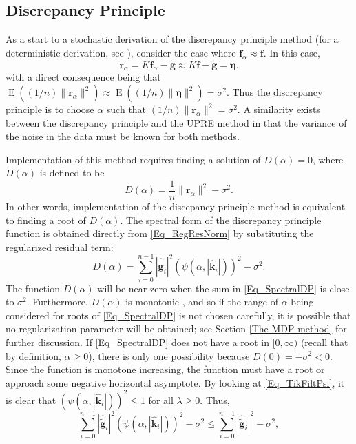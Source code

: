 \documentclass[12pt]{article}
\newcommand{\gnoise}{\widetilde{\mathbf{g}}}
\newcommand{\kdis}{\mathbf{k}}
\newcommand{\kmat}{K}	%
\newcommand{\fdis}{\mathbf{f}}
\newcommand{\regparam}{\alpha}
\newcommand{\freg}{\fdis_{\regparam}}	%
\newcommand{\mfilt}{\psi}
\newcommand{\noiseSD}{\sigma}	%
\newcommand{\noise}{\bm{\eta}}	%
\newcommand{\E}{\operatorname{E}}	%
\newcommand{\regres}{\mathbf{r}_{\regparam}}	%
\newcommand{\D}{D}	%
\begin{document}
\subsection{Discrepancy Principle} \label{Discrepancy Principle}
As a start to a stochastic derivation of the discrepancy principle method (for a deterministic derivation, see \cite{Vogel:2002}), consider the case where $\freg \approx \fdis$. In this case,
\[\regres = \kmat\freg - \gnoise \approx \kmat\fdis - \gnoise = \noise.\]
with a direct consequence being that $\E((1/n)\|\regres\|^2) \approx \E((1/n)\|\noise\|^2) =\noiseSD^2$. Thus the discrepancy principle is to choose $\regparam$ such that $(1/n)\|\regres\|^2 = \noiseSD^2$. A similarity exists between the discrepancy principle and the UPRE method in that the variance of the noise in the data must be known for both methods. \par 
Implementation of this method requires finding a solution of $\D(\regparam) = 0$, where $\D(\regparam)$ is defined to be
\begin{equation}
\label{Eq_DP}
\D(\regparam) = \frac{1}{n}\|\regres\|^2 - \noiseSD^2.
\end{equation}
In other words, implementation of the discepancy principle method is equivalent to finding a root of $\D(\regparam)$. The spectral form of the discrepancy principle function is obtained directly from \eqref{Eq_RegResNorm} by substituting the regularized residual term:
\begin{equation}
\D(\regparam) = \sum_{i = 0}^{n-1} |\widehat{\gnoise}_i|^2(\mfilt(\regparam,|\widehat{\kdis}_i|))^2 - \noiseSD^2.
\label{Eq_SpectralDP}
\end{equation}
The function $\D(\regparam)$ will be near zero when the sum in \eqref{Eq_SpectralDP} is close to $\noiseSD^2$.  Furthermore, $\D(\regparam)$ is monotonic \cite{Vogel:2002}, and so if the range of $\regparam$ being considered for roots of \eqref{Eq_SpectralDP} is not chosen carefully, it is possible that no regularization parameter will be obtained; see Section \ref{The MDP method} for further discussion. If \eqref{Eq_SpectralDP} does not have a root in $[0,\infty)$ (recall that by definition, $\regparam \geq 0$), there is only one possibility because $\D(0) = -\noiseSD^2 < 0$. Since the function is monotone increasing, the function must have a root or approach some negative horizontal asymptote. By looking at \eqref{Eq_TikFiltPsi}, it is clear that $(\mfilt(\regparam,|\widehat{\kdis}_i|))^2 \leq 1$ for all $\lambda \geq 0$. Thus,
\[\sum_{i = 0}^{n-1} |\widehat{\gnoise}_i|^2(\mfilt(\regparam,|\widehat{\kdis}_i|))^2 - \noiseSD^2 \leq \sum_{i = 0}^{n-1} |\widehat{\gnoise}_i|^2 - \noiseSD^2,\]
\end{document}
